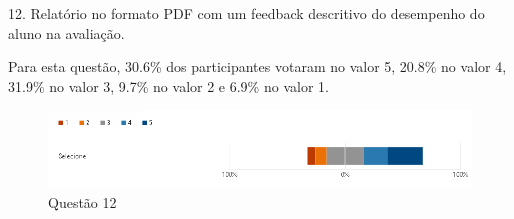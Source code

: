 12. Relatório no formato PDF com um feedback descritivo do desempenho do aluno na avaliação. 

Para esta questão, 30.6\% dos participantes votaram no valor 5, 20.8\% no valor 4, 31.9\% no valor 3, 9.7\% no valor 2 e 6.9\% no valor 1. 

\begin{figure}[H]
\centering
\includegraphics[scale=0.6]{figuras/12.png}
\caption{Questão 12}
\end{figure}
